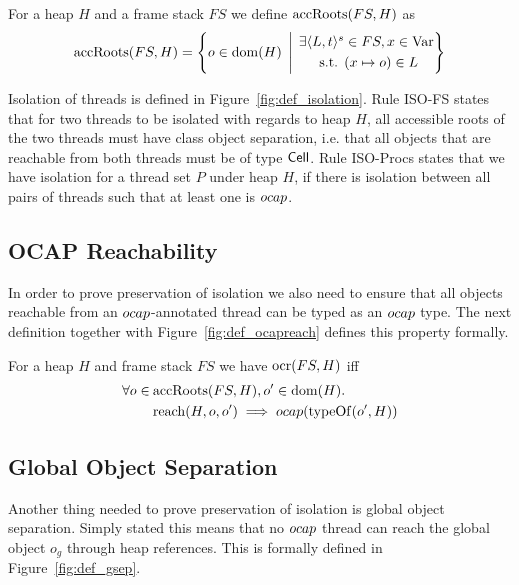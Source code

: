 \begin{definition}
  For a heap $H$ and a frame stack $FS$ we define $\mbox{$\mathrm{accRoots}$}{(FS, H)}$ as
  \begin{equation}
    \mbox{$\mathrm{accRoots}$}{(FS, H)} = \left\{ o \in \mbox{$\mathrm{dom}$}{(H)} \:\: \middle| \:\:
    \begin{aligned}
      \exists \mbox{$\langle L, t \rangle^s$} &\in FS, x \in \mathrm{Var}  \\
         \text{s.t. } & (x \mapsto o) \in L
    \end{aligned}
    \right\}
  \end{equation}
\end{definition}

Isolation of threads is defined in Figure~\ref{fig:def_isolation}. Rule {\sc
ISO-FS} states that for two threads to be isolated with regards to heap $H$, all
accessible roots of the two threads must have class object separation, i.e. that
all objects that are reachable from both threads must be of type $\mbox{$\mathsf{Cell}$}$.
Rule {\sc ISO-Procs} states that we have isolation for a thread set $P$ under
heap $H$, if there is isolation between all pairs of threads such that at least
one is $\mbox{$ocap$}$.

\subsection{OCAP Reachability}%
\label{sub:ocap_reachability}

In order to prove preservation of isolation we also need to ensure that all
objects reachable from an $\mbox{$ocap$}$-annotated thread can be typed as an $\mbox{$ocap$}$
type. The next definition together with Figure~\ref{fig:def_ocapreach} defines
this property formally.
\begin{definition}
  For a heap $H$ and frame stack $FS$ we have $\mbox{$\mathrm{ocr}$}{(FS,H)}$ iff
  \begin{align}
    \label{eq:ocr_def}
    \forall o \in \: &\mbox{$\mathrm{accRoots}$}(FS,H), o' \in \mbox{$\mathrm{dom}$}(H). \notag\\
    &\mbox{$\mathrm{reach}$}{(H, o, o')} \implies \mbox{$ocap$}{(\mbox{$\mathrm{typeOf}$}{(o', H)})}
  \end{align}
\end{definition}

\subsection{Global Object Separation}%
\label{sub:global_object_separation}

Another thing needed to prove preservation of isolation is global object
separation. Simply stated this means that no $\mbox{$ocap$}$ thread can reach the global
object $o_g$ through heap references. This is formally defined in
Figure~\ref{fig:def_gsep}.

